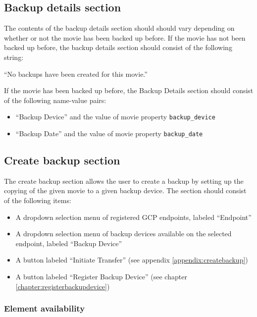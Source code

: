\subsection{Backup details section}

The contents of the backup details section should should vary depending on 
whether or not the movie has been backed up before. If the movie has not been 
backed up before, the backup details section should consist of the following
string: 

\vspace{3mm}
``No backups have been created for this movie.''
\vspace{3mm}

\noindent If the movie has been backed up before, the Backup Details section
should consist of the following name-value pairs:

\begin{itemize}\itemsep1pt
  \item ``Backup Device'' and the value of movie property \texttt{backup\_device}
  \item ``Backup Date'' and the value of movie property \texttt{backup\_date}
\end{itemize}

\subsection{Create backup section}

The create backup section allows the user to create a backup by setting up the
copying of the given movie to a given backup device. The section should consist 
of the following items:

\begin{itemize}\itemsep1pt
  \item A dropdown selection menu of registered GCP endpoints, labeled ``Endpoint''
  \item A dropdown selection menu of backup devices available on the selected 
  endpoint, labeled ``Backup Device''
  \item A button labeled ``Initiate Transfer'' (see appendix 
  \ref{appendix:createbackup})
  \item A button labeled ``Register Backup Device'' (see chapter 
  \ref{chapter:registerbackupdevice})
\end{itemize}

\subsubsection{Element availability}

